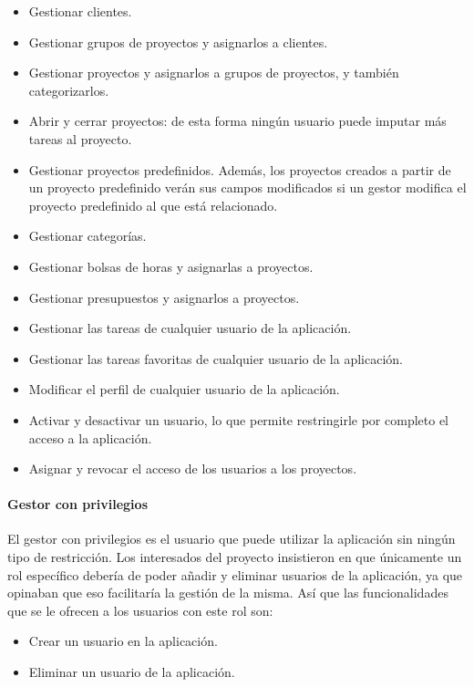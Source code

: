 \begin{itemize}
    \item Gestionar clientes.
    \item Gestionar grupos de proyectos y asignarlos a clientes.
    \item Gestionar proyectos y asignarlos a grupos de proyectos, y también
        categorizarlos.
    \item Abrir y cerrar proyectos: de esta forma ningún usuario puede imputar
        más tareas al proyecto.
    \item Gestionar proyectos predefinidos. Además, los proyectos creados a
        partir de un proyecto predefinido verán sus campos modificados si un
        gestor modifica el proyecto predefinido al que está relacionado.
    \item Gestionar categorías.
    \item Gestionar bolsas de horas y asignarlas a proyectos.
    \item Gestionar presupuestos y asignarlos a proyectos.
    \item Gestionar las tareas de cualquier usuario de la aplicación.
    \item Gestionar las tareas favoritas de cualquier usuario de la aplicación.
    \item Modificar el perfil de cualquier usuario de la aplicación.
    \item Activar y desactivar un usuario, lo que permite restringirle por
        completo el acceso a la aplicación.
    \item Asignar y revocar el acceso de los usuarios a los proyectos.
\end{itemize}

\paragraph{Gestor con privilegios}
El gestor con privilegios es el usuario que puede utilizar la aplicación sin
ningún tipo de restricción. Los interesados del proyecto insistieron en que
únicamente un rol específico debería de poder añadir y eliminar usuarios de la
aplicación, ya que opinaban que eso facilitaría la gestión de la misma. Así que
las funcionalidades que se le ofrecen a los usuarios con este rol son:

\begin{itemize}
    \item Crear un usuario en la aplicación.
    \item Eliminar un usuario de la aplicación.
\end{itemize}
